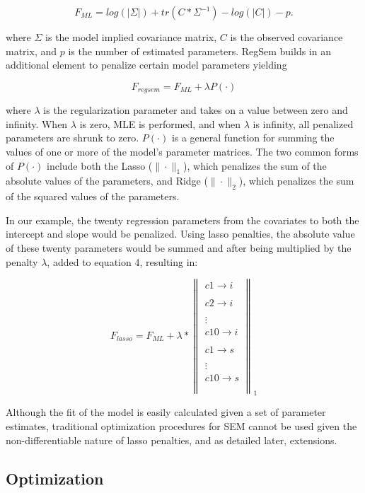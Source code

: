 \documentclass[article]{jss}
\begin{document}
\[\tag{3}
F_{ML}=log(\left|\Sigma\right|)+tr(C*\Sigma^{-1})-log(\left|C\right|)- p.
\]

\noindent
where \(\Sigma\) is the model implied covariance matrix, \(C\) is the
observed covariance matrix, and \(p\) is the number of estimated
parameters. RegSem builds in an additional element to penalize certain
model parameters yielding

\[\tag{4}
F_{regsem} = F_{ML} + \lambda P(\cdot)
\]

\noindent
where \(\lambda\) is the regularization parameter and takes on a value
between zero and infinity. When \(\lambda\) is zero, MLE is performed,
and when \(\lambda\) is infinity, all penalized parameters are shrunk to
zero. \(P(\cdot)\) is a general function for summing the values of one
or more of the model's parameter matrices. The two common forms of
\(P(\cdot)\) include both the Lasso (\(\| \cdot \|_{1}\)), which
penalizes the sum of the absolute values of the parameters, and Ridge
(\(\| \cdot \|_{2}\)), which penalizes the sum of the squared values of
the parameters.

In our example, the twenty regression parameters from the covariates to
both the intercept and slope would be penalized. Using lasso penalties,
the absolute value of these twenty parameters would be summed and after
being multiplied by the penalty \(\lambda\), added to equation 4,
resulting in:

\[\tag{5}
F_{lasso} = F_{ML} + \lambda * \left\|  \begin{matrix}  
c1 \xrightarrow[]{} i\\
c2\xrightarrow[]{}i\\
\vdots \\
c10\xrightarrow[]{}i\\
c1\xrightarrow[]{}s\\
\vdots \\
c10\xrightarrow[]{}s\\
\end{matrix}  \right\|_{1}
\]

Although the fit of the model is easily calculated given a set of
parameter estimates, traditional optimization procedures for SEM cannot
be used given the non-differentiable nature of lasso penalties, and as
detailed later, extensions.

\subsection{Optimization}\label{optimization}
\end{document}
